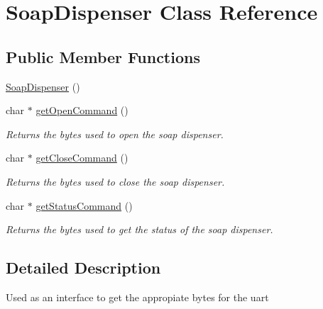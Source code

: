 \hypertarget{class_soap_dispenser}{}\section{Soap\+Dispenser Class Reference}
\label{class_soap_dispenser}
\subsection*{Public Member Functions}
\begin{DoxyCompactItemize}
\item 
\hyperlink{class_soap_dispenser_a6c78d1dd5fb4e9beb6b0cb66dc306096}{Soap\+Dispenser} ()
\item 
char $\ast$ \hyperlink{class_soap_dispenser_a96d2229a526b99b68ca7784c12820a8e}{get\+Open\+Command} ()\hypertarget{class_soap_dispenser_a96d2229a526b99b68ca7784c12820a8e}{}\label{class_soap_dispenser_a96d2229a526b99b68ca7784c12820a8e}

\begin{DoxyCompactList}\small\item\em Returns the bytes used to open the soap dispenser. \end{DoxyCompactList}\item 
char $\ast$ \hyperlink{class_soap_dispenser_a95857bee83a3a26caa30bdfac2872c48}{get\+Close\+Command} ()\hypertarget{class_soap_dispenser_a95857bee83a3a26caa30bdfac2872c48}{}\label{class_soap_dispenser_a95857bee83a3a26caa30bdfac2872c48}

\begin{DoxyCompactList}\small\item\em Returns the bytes used to close the soap dispenser. \end{DoxyCompactList}\item 
char $\ast$ \hyperlink{class_soap_dispenser_a650fdf9c06456f931ca3574c7a63ad73}{get\+Status\+Command} ()\hypertarget{class_soap_dispenser_a650fdf9c06456f931ca3574c7a63ad73}{}\label{class_soap_dispenser_a650fdf9c06456f931ca3574c7a63ad73}

\begin{DoxyCompactList}\small\item\em Returns the bytes used to get the status of the soap dispenser. \end{DoxyCompactList}\end{DoxyCompactItemize}


\subsection{Detailed Description}
Used as an interface to get the appropiate bytes for the uart 


